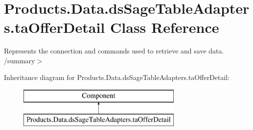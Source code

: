 \hypertarget{class_products_1_1_data_1_1ds_sage_table_adapters_1_1ta_offer_detail}{}\section{Products.\+Data.\+ds\+Sage\+Table\+Adapters.\+ta\+Offer\+Detail Class Reference}
\label{class_products_1_1_data_1_1ds_sage_table_adapters_1_1ta_offer_detail}


Represents the connection and commands used to retrieve and save data. /summary$>$  


Inheritance diagram for Products.\+Data.\+ds\+Sage\+Table\+Adapters.\+ta\+Offer\+Detail\+:\begin{figure}[H]
\begin{center}
\leavevmode
\includegraphics[height=2.000000cm]{class_products_1_1_data_1_1ds_sage_table_adapters_1_1ta_offer_detail}
\end{center}
\end{figure}
